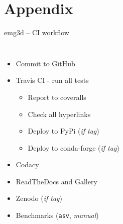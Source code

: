 \documentclass[xcolor=svgnames, aspectratio=169]{beamer}
\begin{document}
  \appendix %

  \maketitle %

  \section{Appendix} %

  \begin{frame}[t]%
    {emg3d -- CI workflow}
    \begin{columns}[t]
      \begin{itemize}
        \item Commit to GitHub
        \item Travis CI - run all tests
          \begin{itemize}
            \item Report to coveralls
            \item Check all hyperlinks
            \item Deploy to PyPi (\emph{if tag})
            \item Deploy to conda-forge (\emph{if tag})
          \end{itemize}
        \item Codacy
        \item ReadTheDocs and Gallery
        \item Zenodo (\emph{if tag})
        \item Benchmarks (\texttt{asv}, \emph{manual})
      \end{itemize}
        \vspace{.5cm}

\end{columns}
\end{frame}
\end{document}
